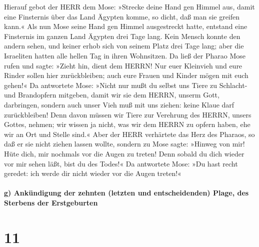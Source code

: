  Hierauf gebot der HERR dem Mose: »Strecke deine Hand gen
Himmel aus, damit eine Finsternis über das Land Ägypten komme, so dicht,
daß man sie greifen kann.«  Als nun Mose seine Hand gen
Himmel ausgestreckt hatte, entstand eine Finsternis im ganzen Land
Ägypten drei Tage lang.  Kein Mensch konnte den andern
sehen, und keiner erhob sich von seinem Platz drei Tage lang; aber die
Israeliten hatten alle hellen Tag in ihren Wohnsitzen. 
Da ließ der Pharao Mose rufen und sagte: »Zieht hin, dient dem HERRN!
Nur euer Kleinvieh und eure Rinder sollen hier zurückbleiben; auch eure
Frauen und Kinder mögen mit euch gehen!«  Da antwortete
Mose: »Nicht nur mußt du selbst uns Tiere zu Schlacht- und Brandopfern
mitgeben, damit wir sie dem HERRN, unserm Gott, darbringen,
 sondern auch unser Vieh muß mit uns ziehen: keine Klaue
darf zurückbleiben! Denn davon müssen wir Tiere zur Verehrung des HERRN,
unsers Gottes, nehmen; wir wissen ja nicht, was wir dem HERRN zu opfern
haben, ehe wir an Ort und Stelle sind.«  Aber der HERR
verhärtete das Herz des Pharaos, so daß er sie nicht ziehen lassen
wollte,  sondern zu Mose sagte: »Hinweg von mir! Hüte
dich, mir nochmals vor die Augen zu treten! Denn sobald du dich wieder
vor mir sehen läßt, bist du des Todes!«  Da antwortete
Mose: »Du hast recht geredet: ich werde dir nicht wieder vor die Augen
treten!«

\hypertarget{g-ankuxfcndigung-der-zehnten-letzten-und-entscheidenden-plage-des-sterbens-der-erstgeburten}{%
\paragraph{g) Ankündigung der zehnten (letzten und entscheidenden)
Plage, des Sterbens der
Erstgeburten}\label{g-ankuxfcndigung-der-zehnten-letzten-und-entscheidenden-plage-des-sterbens-der-erstgeburten}}

\hypertarget{section-10}{%
\section{11}\label{section-10}}

